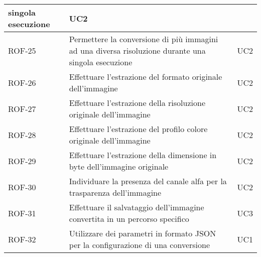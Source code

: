 \begin{table}[H]
\begin{tabularx}{\textwidth}{lXl}
        singola esecuzione
                           & UC2
        \\
        \hline
        ROF-25             & Permettere la conversione di più immagini ad una
        diversa risoluzione durante una singola esecuzione
                           & UC2
        \\
        \hline
        ROF-26             & Effettuare l'estrazione del formato originale dell'immagine
                           & UC2
        \\
        \hline
        ROF-27             & Effettuare l'estrazione della risoluzione originale dell'immagine
                           & UC2
        \\
        \hline
        ROF-28             & Effettuare l'estrazione del profilo colore originale dell'immagine
                           & UC2
        \\
        \hline
        ROF-29             & Effettuare l'estrazione della dimensione in byte
        dell'immagine originale
                           & UC2
        \\
        \hline
        ROF-30             & Individuare la presenza del canale alfa per la
        trasparenza dell'immagine
                           & UC2
        \\
        \hline
        ROF-31             & Effettuare il salvataggio dell'immagine convertita
        in un percorso specifico
                           & UC3
        \\
        \hline
        ROF-32             & Utilizzare dei parametri in formato JSON per la
        configurazione di una conversione
                           & UC1
        \\
        \hline
    \end{tabularx}
\end{table}%
